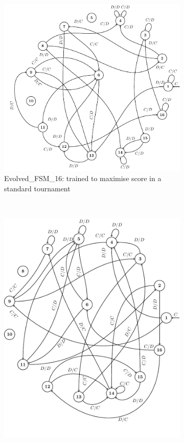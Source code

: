 \documentclass{article}
\begin{document}
\begin{figure}[!hbtp]
    \centering
    \begin{subfigure}[t]{.5\textwidth}
        \includegraphics[height=.3\textheight]{./assets/FSM16.pdf}
        \caption{Evolved\_FSM\_16: trained to maximise score in a standard
        tournament}
        \label{fig:fsm16}
    \end{subfigure}%
    ~
    \begin{subfigure}[t]{.5\textwidth}
        \centering
        \includegraphics[height=.35\textheight]{./assets/FSM16noise.pdf}

\end{subfigure}
\end{figure}
\end{document}
